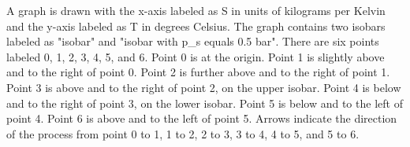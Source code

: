 A graph is drawn with the x-axis labeled as S in units of kilograms per Kelvin and the y-axis labeled as T in degrees Celsius. The graph contains two isobars labeled as "isobar" and "isobar with p_s equals 0.5 bar". There are six points labeled 0, 1, 2, 3, 4, 5, and 6. Point 0 is at the origin. Point 1 is slightly above and to the right of point 0. Point 2 is further above and to the right of point 1. Point 3 is above and to the right of point 2, on the upper isobar. Point 4 is below and to the right of point 3, on the lower isobar. Point 5 is below and to the left of point 4. Point 6 is above and to the left of point 5. Arrows indicate the direction of the process from point 0 to 1, 1 to 2, 2 to 3, 3 to 4, 4 to 5, and 5 to 6.